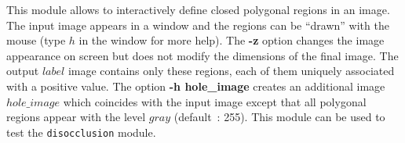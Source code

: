 This module allows to interactively define closed polygonal regions in an
image. The input image appears in a window and the regions can be ``drawn'' with the mouse (type $h$ in the window for more help). The {\bf -z} option changes the image appearance on screen but does not modify the dimensions of the final image. The output $label$ image contains only these regions, each of them uniquely associated with a positive value. The option {\bf -h hole\_image} creates an additional image $hole\_image$ which coincides with the input image except that all polygonal regions appear with the level $gray$ (default~: 255). This module can be used to test the \verb+disocclusion+ module.